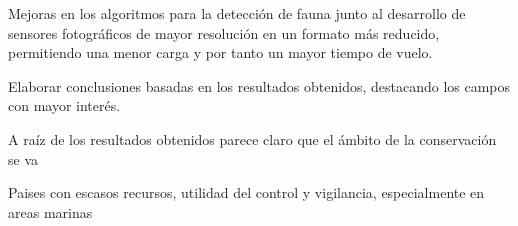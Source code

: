 \documentclass[11pt,]{article}
\begin{document}
Mejoras en los algoritmos para la detección de fauna junto al desarrollo
de sensores fotográficos de mayor resolución en un formato más reducido,
permitiendo una menor carga y por tanto un mayor tiempo de vuelo.

Elaborar conclusiones basadas en los resultados obtenidos, destacando
los campos con mayor interés.

A raíz de los resultados obtenidos parece claro que el ámbito de la
conservación se va

Paises con escasos recursos, utilidad del control y vigilancia,
especialmente en areas marinas

\newpage
\singlespacing 

\end{document}
